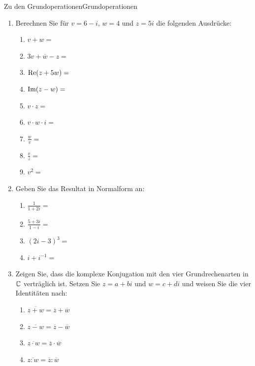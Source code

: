 \begin{ueb}
    {Zu den Grundoperationen}{Grundoperationen}
    \begin{enumerate}
        \item Berechnen Sie für $v=6-i$, $w=4$ und $z=5i$ die folgenden Ausdrücke:
        \begin{enumerate}
            \item $v+w=$
            \vfill
            \item $3v+\overline{w}-z=$
            \vfill
            \item $\mathrm{Re}(z+5w)=$
            \vfill
            \item $\mathrm{Im}(z-w)=$
            \item $v\cdot z=$
            \vfill
            \item $v\cdot w\cdot i=$
            \vfill
            \item $\frac{w}{v}=$
            \vfill
            \item $\frac{v}{z}=$
            \vfill
            \item $v^2=$
            \end{enumerate}
        \item Geben Sie das Resultat in Normalform an:
        \begin{enumerate}
            \item $\displaystyle{\frac{1}{1+2i}=}$\vfill
            \item $\displaystyle{\frac{\overline{5+3i}}{1-i}}=$\vfill
            \item $(2i-3)^3=$\vfill
            \item $i+i^{-1}=$\vfill
        \end{enumerate}
        \item Zeigen Sie, dass die komplexe Konjugation mit den vier Grundrechenarten in $\mathbb{C}$ verträglich ist. Setzen Sie $z= a + bi$ und $w=c+di$ und weisen Sie die vier Identitäten nach: 
        \begin{enumerate}
            \item $\overline{z+w}=\overline{z}+\overline{w}$
            \vfill
            \item $\overline{z-w}=\overline{z}-\overline{w}$
            \vfill
            \item $\overline{z\cdot w}=\overline{z}\cdot \overline{w}$
            \vfill
            \item $\overline{z : w}=\overline{z}:\overline{w}$
            \vfill
        \end{enumerate}

\end{enumerate}
\end{ueb}
